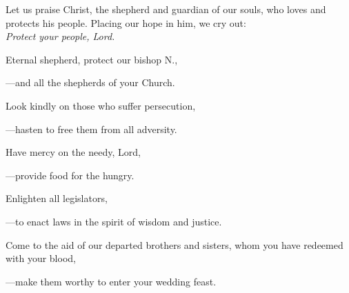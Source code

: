 \intercessions\indent

\begin{hangpar}

Let us praise Christ, the shepherd and guardian of our souls, who loves and protects his people. Placing our hope in him, we cry out:\\
\emph{Protect your people, Lord.}

\medskip Eternal shepherd, protect our bishop N.,

{\color{red}---\thinspace}and all the shepherds of your Church.

\medskip Look kindly on those who suffer persecution,

{\color{red}---\thinspace}hasten to free them from all adversity.

\medskip Have mercy on the needy, Lord,

{\color{red}---\thinspace}provide food for the hungry.

\medskip Enlighten all legislators,

{\color{red}---\thinspace}to enact laws in the spirit of wisdom and justice.

\medskip Come to the aid of our departed brothers and sisters, whom you have redeemed with your blood,

{\color{red}---\thinspace}make them worthy to enter your wedding feast.

\end{hangpar}

